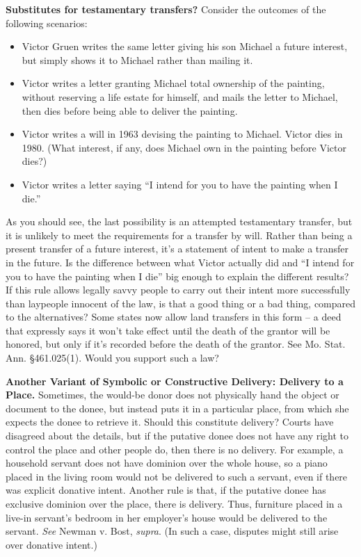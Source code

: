 \item \textbf{Substitutes for testamentary transfers?} Consider the
outcomes of the following scenarios:
\begin{itemize}
\item Victor Gruen writes the same letter giving his son Michael a future
interest, but simply shows it to Michael rather than mailing it.
\item Victor writes a letter granting Michael total ownership of the painting,
without reserving a life estate for himself, and mails the letter to Michael,
then dies before being able to deliver the painting.
\item Victor writes a will in 1963 devising the painting to Michael.  Victor
dies in 1980.  (What interest, if any, does Michael own in the painting before
Victor dies?)
\item Victor writes a letter saying ``I intend for you to have the painting when
I die.''
\end{itemize}

As you should see, the last possibility is an attempted testamentary transfer,
but it is unlikely to meet the requirements for a transfer by will.  Rather
than being a present transfer of a future interest, it's a statement of intent
to make a transfer in the future.  Is the difference between what Victor
actually did and ``I intend for you to have the painting when I die'' big
enough to explain the different results?  If this rule allows legally savvy
people to carry out their intent more successfully than laypeople innocent of
the law, is that a good thing or a bad thing, compared to the alternatives? 
Some states now allow land transfers in this form -- a deed that expressly says
it won't take effect until the death of the grantor will be honored, but only
if it's recorded before the death of the grantor.  See Mo. Stat. Ann.
{\S}461.025(1).  Would you support such a law?



\item \textbf{Another Variant of Symbolic or Constructive Delivery: Delivery to
a Place.}  Sometimes, the would-be donor does not physically hand the object or
document to the donee, but instead puts it in a particular place, from which
she expects the donee to retrieve it.  Should this constitute delivery?  Courts
have disagreed about the details, but if the putative donee does not have any
right to control the place and other people do, then there is no delivery.  For
example, a household servant does not have dominion over the whole house, so a
piano placed in the living room would not be delivered to such a servant, even
if there was explicit donative intent.  Another rule is that, if the putative
donee has exclusive dominion over the place, there is delivery.  Thus,
furniture placed in a live-in servant's bedroom in her employer's house would
be delivered to the servant.  \textit{See }Newman v. Bost, \textit{supra}. (In
such a case, disputes might still arise over donative intent.)  


